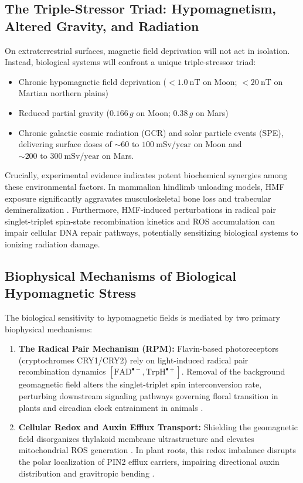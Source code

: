 \subsection{The Triple-Stressor Triad: Hypomagnetism, Altered Gravity, and Radiation}
On extraterrestrial surfaces, magnetic field deprivation will not act in isolation. Instead, biological systems will confront a unique triple-stressor triad:
\begin{itemize}
    \item Chronic hypomagnetic field deprivation ($< \SI{1.0}{\nano\tesla}$ on Moon; $< \SI{20}{\nano\tesla}$ on Martian northern plains)
    \item Reduced partial gravity ($0.166\,g$ on Moon; $0.38\,g$ on Mars)
    \item Chronic galactic cosmic radiation (GCR) and solar particle events (SPE), delivering surface doses of $\sim 60\text{ to }\SI{100}{\milli\sievert}/\text{year}$ on Moon and $\sim 200\text{ to }\SI{300}{\milli\sievert}/\text{year}$ on Mars.
\end{itemize}

Crucially, experimental evidence indicates potent biochemical synergies among these environmental factors. In mammalian hindlimb unloading models, HMF exposure significantly aggravates musculoskeletal bone loss and trabecular demineralization \citep{Xu2012, Mo2014}. Furthermore, HMF-induced perturbations in radical pair singlet-triplet spin-state recombination kinetics and ROS accumulation \citep{Binhi2017, Hore2016} can impair cellular DNA repair pathways, potentially sensitizing biological systems to ionizing radiation damage.

\subsection{Biophysical Mechanisms of Biological Hypomagnetic Stress}
The biological sensitivity to hypomagnetic fields is mediated by two primary biophysical mechanisms:
\begin{enumerate}
    \item \textbf{The Radical Pair Mechanism (RPM):} Flavin-based photoreceptors (cryptochromes CRY1/CRY2) rely on light-induced radical pair recombination dynamics $[\text{FAD}^{\bullet-}, \text{TrpH}^{\bullet+}]$. Removal of the background geomagnetic field alters the singlet-triplet spin interconversion rate, perturbing downstream signaling pathways governing floral transition in plants \citep{Agliassa2018} and circadian clock entrainment in animals \citep{Yoshii2009}.
    \item \textbf{Cellular Redox and Auxin Efflux Transport:} Shielding the geomagnetic field disorganizes thylakoid membrane ultrastructure \citep{Belyavskaya2004} and elevates mitochondrial ROS generation \citep{Maffei2014}. In plant roots, this redox imbalance disrupts the polar localization of PIN2 efflux carriers, impairing directional auxin distribution and gravitropic bending \citep{Narayana2018}.
\end{enumerate}

